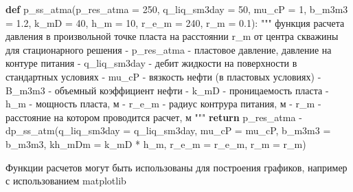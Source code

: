 \documentclass[
  russian,
  letterpaper,
  DIV=11,
  numbers=noendperiod,
  oneside]{scrartcl}
\newenvironment{Shaded}{\begin{snugshade}}{\end{snugshade}}
\newcommand{\CommentTok}[1]{\textcolor[rgb]{0.37,0.37,0.37}{#1}}
\newcommand{\ControlFlowTok}[1]{\textcolor[rgb]{0.00,0.23,0.31}{\textbf{#1}}}
\newcommand{\DecValTok}[1]{\textcolor[rgb]{0.68,0.00,0.00}{#1}}
\newcommand{\FloatTok}[1]{\textcolor[rgb]{0.68,0.00,0.00}{#1}}
\newcommand{\KeywordTok}[1]{\textcolor[rgb]{0.00,0.23,0.31}{\textbf{#1}}}
\newcommand{\NormalTok}[1]{\textcolor[rgb]{0.00,0.23,0.31}{#1}}
\newcommand{\OperatorTok}[1]{\textcolor[rgb]{0.37,0.37,0.37}{#1}}
\begin{document}
\begin{Shaded}
\begin{Highlighting}[]
\KeywordTok{def}\NormalTok{ p\_ss\_atma(p\_res\_atma }\OperatorTok{=} \DecValTok{250}\NormalTok{,}
\NormalTok{              q\_liq\_sm3day }\OperatorTok{=} \DecValTok{50}\NormalTok{,}
\NormalTok{              mu\_cP }\OperatorTok{=} \DecValTok{1}\NormalTok{,}
\NormalTok{              b\_m3m3 }\OperatorTok{=} \FloatTok{1.2}\NormalTok{,}
\NormalTok{              k\_mD }\OperatorTok{=} \DecValTok{40}\NormalTok{,}
\NormalTok{              h\_m }\OperatorTok{=} \DecValTok{10}\NormalTok{,}
\NormalTok{              r\_e\_m }\OperatorTok{=} \DecValTok{240}\NormalTok{,}
\NormalTok{              r\_m }\OperatorTok{=} \FloatTok{0.1}\NormalTok{):}
  \CommentTok{"""}
\CommentTok{  функция расчета давления в произвольной точке пласта }
\CommentTok{  на расстоянии r\_m от центра скважины для стационарного решения }
\CommentTok{  {-} p\_res\_atma {-} пластовое давление, давление на контуре питания}
\CommentTok{  {-} q\_liq\_sm3day {-} дебит жидкости на поверхности в стандартных условиях}
\CommentTok{  {-} mu\_cP {-} вязкость нефти (в пластовых условиях)}
\CommentTok{  {-} B\_m3m3 {-} объемный коэффициент нефти }
\CommentTok{  {-} k\_mD {-} проницаемость пласта}
\CommentTok{  {-} h\_m {-} мощность пласта, м}
\CommentTok{  {-} r\_e\_m {-} радиус контрура питания, м  }
\CommentTok{  {-} r\_m {-} расстояние на котором проводится расчет, м}
\CommentTok{  """}
  \ControlFlowTok{return}\NormalTok{ p\_res\_atma }\OperatorTok{{-}}\NormalTok{ dp\_ss\_atm(q\_liq\_sm3day }\OperatorTok{=}\NormalTok{ q\_liq\_sm3day,}
\NormalTok{                                mu\_cP }\OperatorTok{=}\NormalTok{ mu\_cP,}
\NormalTok{                                b\_m3m3 }\OperatorTok{=}\NormalTok{ b\_m3m3,}
\NormalTok{                                kh\_mDm }\OperatorTok{=}\NormalTok{ k\_mD }\OperatorTok{*}\NormalTok{ h\_m,}
\NormalTok{                                r\_e\_m }\OperatorTok{=}\NormalTok{ r\_e\_m,}
\NormalTok{                                r\_m }\OperatorTok{=}\NormalTok{ r\_m)}
\end{Highlighting}
\end{Shaded}

Функции расчетов могут быть использованы для построения графиков,
например с использованием matplotlib
\end{document}
